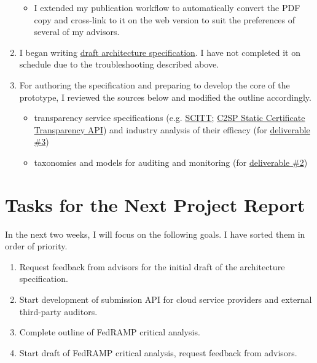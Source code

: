 \documentclass{jdf}
\begin{document}
\begin{enumerate}
\begin{itemize}
            \item I extended my publication workflow to automatically convert the PDF copy and cross-link to it on the web version to suit the preferences of several of my advisors.
        \end{itemize}
    \item I began writing \hyperlink{https://add-architecture-draft--conmotion.netlify.app/architecture.html}{draft architecture specification}. I have not completed it on schedule due to the troubleshooting described above.
    \item For authoring the specification and preparing to develop the core of the prototype, I reviewed the sources below and modified the outline accordingly.
        \begin{itemize}
            \item transparency service specifications (e.g. \hyperlink{https://datatracker.ietf.org/doc/draft-ietf-scitt-architecture/}{SCITT}; \hyperlink{https://c2sp.org/static-ct-api}{C2SP Static Certificate Transparency API}) and industry analysis of their efficacy (for  \hyperlink{https://github.com/aj-stein/practicum_proposal/blob/main/paper.pdf}{deliverable \#3})
            \item taxonomies and models for auditing and monitoring (for  \hyperlink{https://github.com/aj-stein/practicum_proposal/blob/main/paper.pdf}{deliverable \#2})
        \end{itemize}
\end{enumerate}

\section*{Tasks for the Next Project Report}

In the next two weeks, I will focus on the following goals. I have sorted them in order of priority.

\begin{enumerate}
    \item Request feedback from advisors for the initial draft of the architecture specification.
    \item Start development of submission API for cloud service providers and external third-party auditors.
    \item Complete outline of FedRAMP critical analysis.
    \item Start draft of FedRAMP critical analysis, request feedback from advisors.
\end{enumerate}
\end{document}
